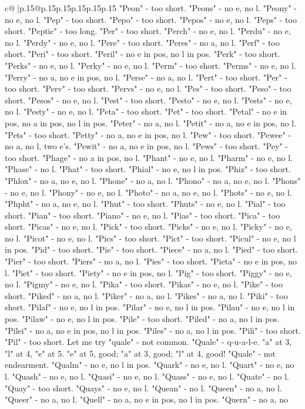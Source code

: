 \documentclass{article}
\begin{document}
{\begin{supertabular}{c@{$\;$}|p{.15\linewidth}@{}p{.15\linewidth}p{.15\linewidth}p{.15\linewidth}p{.15\linewidth}p{.15\linewidth}}
{{{"Peon" {-} too short. "Peons" {-} no e, no l. "Peony" {-} no e, no l. "Pep" {-} too short. "Pepo" {-} too short. "Pepos" {-} no e, no l. "Peps" {-} too short. "Peptic" {-} too long. "Per" {-} too short. "Perch" {-} no e, no l. "Perdu" {-} no e, no l. "Perdy" {-} no e, no l. "Pere" {-} too short. "Peres" {-} no a, no l. "Perf" {-} too short. "Peri" {-} too short. "Peril" {-} no e in pos, no l in pos. "Perk" {-} too short. "Perks" {-} no e, no l. "Perky" {-} no e, no l. "Perm" {-} too short. "Perms" {-} no e, no l. "Perry" {-} no a, no e in pos, no l. "Perse" {-} no a, no l. "Pert" {-} too short. "Per" {-} too short. "Perv" {-} too short. "Pervs" {-} no e, no l. "Pes" {-} too short. "Peso" {-} too short. "Pesos" {-} no e, no l. "Pest" {-} too short. "Pesto" {-} no e, no l. "Pests" {-} no e, no l. "Pesty" {-} no e, no l. "Peta" {-} too short. "Pet" {-} too short. "Petal" {-} no e in pos, no a in pos, no l in pos. "Peter" {-} no a, no l. "Petit" {-} no a, no e in pos, no l. "Pets" {-} too short. "Petty" {-} no a, no e in pos, no l. "Pew" {-} too short. "Pewee" {-} no a, no l, two e's. "Pewit" {-} no a, no e in pos, no l. "Pews" {-} too short. "Pey" {-} too short. "Phage" {-} no a in pos, no l. "Phant" {-} no e, no l. "Pharm" {-} no e, no l. "Phase" {-} no l. "Phat" {-} too short. "Phial" {-} no e, no l in pos. "Phiz" {-} too short. "Phlox" {-} no a, no e, no l. "Phone" {-} no a, no l. "Phono" {-} no a, no e, no l. "Phons" {-} no e, no l. "Phony" {-} no e, no l. "Photo" {-} no a, no e, no l. "Phots" {-} no e, no l. "Phpht" {-} no a, no e, no l. "Phut" {-} too short. "Phuts" {-} no e, no l. "Pial" {-} too short. "Pian" {-} too short. "Piano" {-} no e, no l. "Pias" {-} too short. "Pica" {-} too short. "Picas" {-} no e, no l. "Pick" {-} too short. "Picks" {-} no e, no l. "Picky" {-} no e, no l. "Picot" {-} no e, no l. "Pics" {-} too short. "Pict" {-} too short. "Picul" {-} no e, no l in pos. "Pid" {-} too short. "Pie" {-} too short. "Piece" {-} no a, no l. "Pied" {-} too short. "Pier" {-} too short. "Piers" {-} no a, no l. "Pies" {-} too short. "Pieta" {-} no e in pos, no l. "Piet" {-} too short. "Piety" {-} no e in pos, no l. "Pig" {-} too short. "Piggy" {-} no e, no l. "Pigmy" {-} no e, no l. "Pika" {-} too short. "Pikas" {-} no e, no l. "Pike" {-} too short. "Piked" {-} no a, no l. "Piker" {-} no a, no l. "Pikes" {-} no a, no l. "Piki" {-} too short. "Pilaf" {-} no e, no l in pos. "Pilar" {-} no e, no l in pos. "Pilau" {-} no e, no l in pos. "Pilaw" {-} no e, no l in pos. "Pile" {-} too short. "Piled" {-} no a, no l in pos. "Pilei" {-} no a, no e in pos, no l in pos. "Piles" {-} no a, no l in pos. "Pili" {-} too short. "Pil" {-} too short. Let me try "quale" {-} not common. "Quale" {-} q{-}u{-}a{-}l{-}e. "a" at 3, "l" at 4, "e" at 5. "e" at 5, good; "a" at 3, good; "l" at 4, good! "Quale" {-} not endearment. "Qualm" {-} no e, no l in pos. "Quark" {-} no e, no l. "Quart" {-} no e, no l. "Quash" {-} no e, no l. "Quasi" {-} no e, no l. "Quass" {-} no e, no l. "Quate" {-} no l. "Quay" {-} too short. "Quays" {-} no e, no l. "Quean" {-} no l. "Queen" {-} no a, no l. "Queer" {-} no a, no l. "Quell" {-} no a, no e in pos, no l in pos. "Quern" {-} no a, no }}}
\end{supertabular}}
\end{document}
